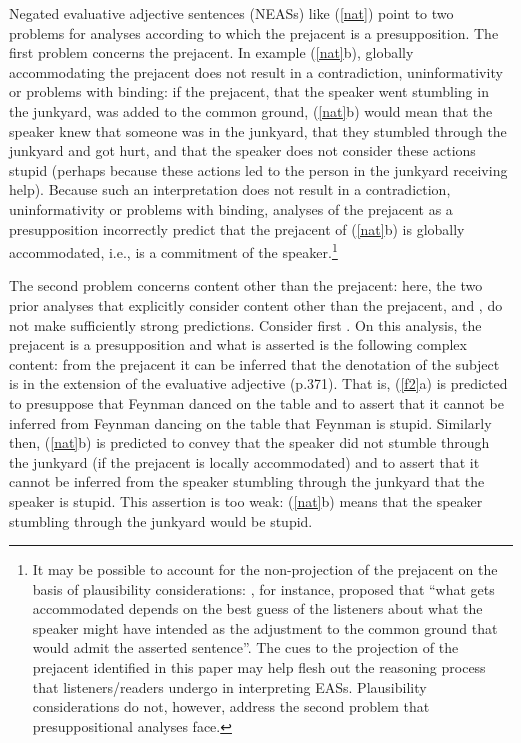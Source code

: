 \documentclass[11pt,fleqn]{article}
\newcommand{\6}{\mbox{$[\hspace*{-.6mm}[$}}
\newcommand{\9}{\mbox{$]\hspace*{-.6mm}]$}}
\begin{document}
Negated evaluative adjective sentences (NEASs) like (\ref{nat}) point to two problems for analyses according to which the prejacent is a presupposition. The first problem concerns the prejacent. In example (\ref{nat}b), globally accommodating the prejacent does not result in a contradiction, uninformativity or problems with binding: if the prejacent, that the speaker went stumbling in the junkyard, was added to the common ground, (\ref{nat}b) would mean that the speaker knew that someone was in the junkyard, that they stumbled through the junkyard and got hurt, and that the speaker does not consider these actions stupid (perhaps because these actions led to the person in the junkyard receiving help). Because such an interpretation does not result in a contradiction, uninformativity or problems with binding, analyses of the prejacent as a presupposition incorrectly  predict that the prejacent of (\ref{nat}b) is globally accommodated, i.e., is a commitment of the speaker.\footnote{It may be possible to account for the non-projection of the prejacent on the basis of plausibility considerations: \citealt[162]{vonfintel08}, for instance,  proposed that ``what gets accommodated depends on the best guess of the listeners about what the speaker might have intended as the adjustment to the common ground that would admit the asserted sentence''. The cues to the projection of the prejacent identified in this paper may help flesh out the reasoning process that listeners/readers undergo in interpreting EASs. Plausibility considerations do not, however, address the second problem that presuppositional analyses face.}

The second problem concerns content other than the prejacent: here, the two prior analyses that explicitly consider content other than the prejacent, \citealt{oshima09b} and \citealt{barker02}, do not make sufficiently strong predictions. Consider first \citealt{oshima09b}. On this analysis, the prejacent is a presupposition and what is asserted is the following complex content: from the prejacent it can be inferred that the denotation of the subject is in the extension of the evaluative adjective (p.371). That is, (\ref{f2}a) is predicted to presuppose that Feynman danced on the table and to assert that it cannot be inferred from Feynman dancing on the table that Feynman is stupid. Similarly then, (\ref{nat}b) is predicted to convey that the speaker did not stumble through the junkyard (if the prejacent is locally accommodated) and to assert that it cannot be inferred from the speaker stumbling through the junkyard that the speaker is stupid. This assertion is too weak: (\ref{nat}b) means that the speaker stumbling through the junkyard would be stupid. 
\end{document}
